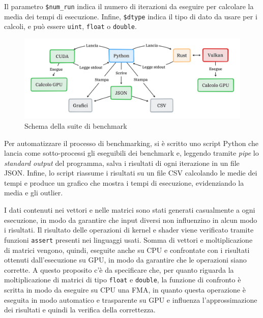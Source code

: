 Il parametro \verb|$num_run| indica il numero di iterazioni da eseguire per calcolare la media dei tempi di esecuzione. Infine, \verb|$dtype| indica il tipo di dato da usare per i calcoli, e può essere \verb|uint|, \verb|float| o \verb|double|.

\begin{figure}[ht]
  \centering
  \includegraphics[width=1\linewidth]{images/chapter4/arch_bench.png}
  \caption{Schema della suite di benchmark}
  \label{fig:arch_bench}
\end{figure}

Per automatizzare il processo di benchmarking, si è scritto uno script Python che lancia come sotto-processi gli eseguibili dei benchmark e, leggendo tramite \textit{pipe} lo \textit{standard output} del programma, salva i risultati di ogni iterazione in un file \gls{JSON}. Infine, lo script riassume i risultati su un file \gls{CSV} calcolando le medie dei tempi e produce un grafico che mostra i tempi di esecuzione, evidenziando la media e gli outlier.


I dati contenuti nei vettori e nelle matrici sono stati generati casualmente a ogni esecuzione, in modo da garantire che input diversi non influenzino in alcun modo i risultati. Il risultato delle operazioni di kernel e shader viene verificato tramite funzioni \verb|assert| presenti nei linguaggi usati. Somma di vettori e moltiplicazione di matrici vengono, quindi, eseguite anche su \gls{CPU} e confrontate con i risultati ottenuti dall'esecuzione su \gls{GPU}, in modo da garantire che le operazioni siano corrette. A questo proposito c'è da specificare che, per quanto riguarda la moltiplicazione di matrici di tipo \verb|float| e \verb|double|, la funzione di confronto è scritta in modo da eseguire su \gls{CPU} una \gls{FMA}, in quanto questa operazione è eseguita in modo automatico e trasparente su \gls{GPU} e influenza l'approssimazione dei risultati e quindi la verifica della correttezza.

